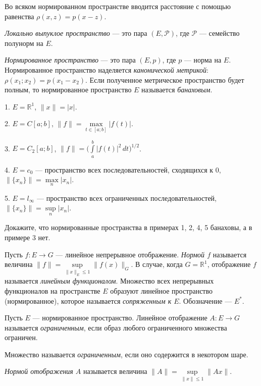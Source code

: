 \documentclass[10pt]{article}
\begin{document}
Во всяком нормированном пространстве вводится расстояние с помощью
равенства $\rho(x,z)=p(x-z)$.

\begin{df}
\emph{Локально выпуклое пространство} --- это пара
$(E,\mathcal{P})$, где $\mathcal{P}$ --- семейство полунорм на $E$.

\emph{Нормированное пространство} --- это пара $(E,p)$, где $p$ ---
норма на $E$. Нормированное пространство наделяется
\emph{канонической метрикой}: $\rho(x_1;x_2)=p(x_1-x_2)$. Если
полученное метрическое пространство будет полным, то нормированное
пространство $E$ называется \emph{банаховым}.
\end{df}

\begin{ex}
  1. $E=\mathbb{R}^1$, $\|x\|=|x|$.

  2. $E=C[a;b]$, $\|f\|=\max\limits_{t\in[a;b]}|f(t)|$.

  3. $E=C_2[a;b]$,
  $\|f\|=\Big(\int\limits_a^b\!|f(t)|^2\,dt\Big)^{1/2}$.

  4. $E=c_0$ --- пространство всех последовательностей, сходящихся к
  0, $\|\{x_n\}\|=\max\limits_n|x_n|$.

  5. $E=l_\infty$ --- пространство всех ограниченных
  последовательностей, $\|\{x_n\}\|=\sup\limits_n|x_n|$.
\end{ex}
\begin{problem}
Докажите, что нормированные пространства в примерах 1, 2, 4, 5
банаховы, а в примере 3 нет.
\end{problem}

\begin{df}
Пусть $f\colon E\to G$ --- линейное непрерывное отображение.
\emph{Нормой $f$} называется величина
$\|f\|=\sup\limits_{\|x\|_E\leqslant1}\|f(x)\|_G$. В случае, когда
$G=\mathbb{R}^1$, отображение $f$ называется \emph{линейным
функционалом}. Множество всех непрерывных функционалов на
пространстве $E$ образуют линейное пространство (нормированное),
которое называется \emph{сопряженным к $E$}. Обозначение --- $E^*$.
\end{df}



\begin{df}
Пусть $E$ --- нормированное пространство. Линейное отображение
$A\colon E\to G$ называется \emph{ограниченным}, если образ любого
ограниченного множества ограничен.

Множество называется \emph{ограниченным}, если оно содержится в
некотором шаре.

\emph{Нормой отображения $A$} называется величина
$\|A\|=\sup\limits_{\|x\|\leqslant 1}\|Ax\|$.
\end{df}
\end{document}
